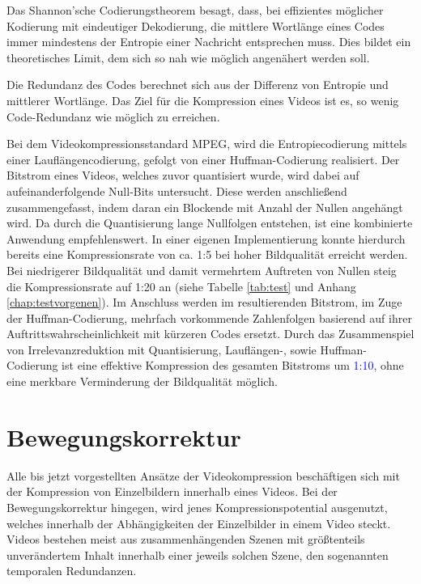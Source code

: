 Das Shannon'sche Codierungstheorem besagt, dass, bei effizientes möglicher Kodierung mit eindeutiger Dekodierung, die mittlere Wortlänge eines Codes immer mindestens der Entropie einer Nachricht entsprechen muss. Dies bildet ein theoretisches Limit, dem sich so nah wie möglich angenähert werden soll.

Die Redundanz des Codes berechnet sich aus der Differenz von Entropie und mittlerer Wortlänge. Das Ziel für die Kompression eines Videos ist es, so wenig Code-Redundanz wie möglich zu erreichen.

Bei dem Videokompressionsstandard MPEG, wird die Entropiecodierung mittels einer Lauflängencodierung, gefolgt von einer Huffman-Codierung realisiert. Der Bitstrom eines Videos, welches zuvor quantisiert wurde, wird dabei auf aufeinanderfolgende Null-Bits untersucht. Diese werden anschließend zusammengefasst, indem daran ein Blockende mit Anzahl der Nullen angehängt wird.
Da durch die Quantisierung lange Nullfolgen entstehen, ist eine kombinierte Anwendung empfehlenswert.
In einer eigenen Implementierung konnte hierdurch bereits eine Kompressionsrate von ca. 1:5 bei hoher Bildqualität erreicht werden. Bei niedrigerer Bildqualität und damit vermehrtem Auftreten von Nullen steig die Kompressionsrate auf 1:20 an (siehe Tabelle \ref{tab:test} und Anhang \ref{chap:testvorgenen}).
Im Anschluss werden im resultierenden Bitstrom, im Zuge der Huffman-Codierung, mehrfach vorkommende Zahlenfolgen basierend auf ihrer Auftrittswahrscheinlichkeit mit kürzeren Codes ersetzt.
Durch das Zusammenspiel von Irrelevanzreduktion mit Quantisierung, Lauflängen-, sowie Huffman-Codierung ist eine effektive Kompression des gesamten Bitstroms um \textcolor{blue}{1:10}, ohne eine merkbare Verminderung der Bildqualität möglich.

\section{Bewegungskorrektur}
Alle bis jetzt vorgestellten Ansätze der Videokompression beschäftigen sich mit der Kompression von Einzelbildern innerhalb eines Videos. Bei der Bewegungskorrektur hingegen, wird jenes Kompressionspotential ausgenutzt, welches innerhalb der Abhängigkeiten der Einzelbilder in einem Video steckt.
Videos bestehen meist aus zusammenhängenden Szenen mit größtenteils unverändertem Inhalt innerhalb einer jeweils solchen Szene, den sogenannten temporalen Redundanzen.

